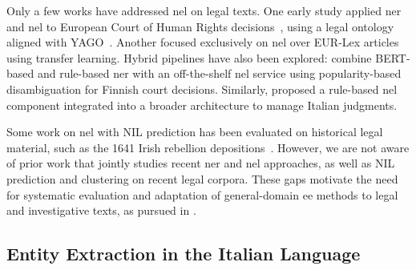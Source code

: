 Only a few works have addressed \ac{nel} on legal texts. One early study applied \ac{ner} and \ac{nel} to European Court of Human Rights decisions~\cite{cardellino_etal_2017_lowcost}, using a legal ontology aligned with YAGO~\cite{mahdisoltani2013yago3,yago2_2013,yago2s_demo_2013,yago_core_2007}. Another focused exclusively on \ac{nel} over EUR-Lex articles~\cite{Elnaggar2018} using transfer learning. Hybrid pipelines have also been explored: \textcite{Tamper2020} combine BERT-based and rule-based \ac{ner} with an off-the-shelf \ac{nel} service using popularity-based disambiguation for Finnish court decisions. Similarly, \textcite{bellandi2025streamlining} proposed a rule-based \ac{nel} component integrated into a broader architecture to manage Italian judgments.

Some work on \ac{nel} with NIL prediction has been evaluated on historical legal material, such as the 1641 Irish rebellion depositions~\cite{klie-etal-2020-zero}. However, we are not aware of prior work that jointly studies recent \ac{ner} and \ac{nel} approaches, as well as NIL prediction and clustering on recent legal corpora. These gaps motivate the need for systematic evaluation and adaptation of general-domain \ac{ee} methods to legal and investigative texts, as pursued in .






\subsection{Entity Extraction in the Italian Language}
\label{sec:sota:ee:ita}



